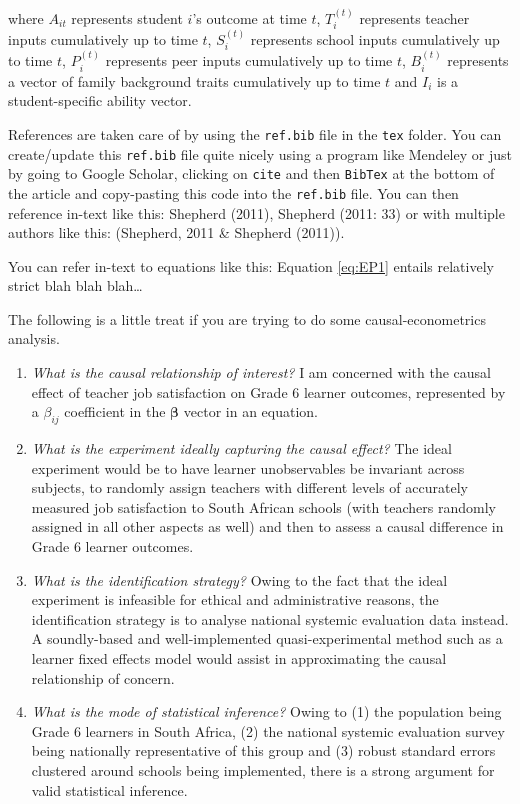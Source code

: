 \documentclass[12pt,preprint, authoryear]{article}
\numberwithin{equation}{section}
\numberwithin{figure}{section}
\numberwithin{table}{section}
\begin{document}
where \(A_{it}\) represents student \(i\)'s outcome at time \(t\),
\(T_i^{(t)}\) represents teacher inputs cumulatively up to time \(t\),
\(S_i^{(t)}\) represents school inputs cumulatively up to time \(t\),
\(P_i^{(t)}\) represents peer inputs cumulatively up to time \(t\),
\(B_i^{(t)}\) represents a vector of family background traits
cumulatively up to time \(t\) and \(I_i\) is a student-specific ability
vector.

References are taken care of by using the \texttt{ref.bib} file in the
\texttt{tex} folder. You can create/update this \texttt{ref.bib} file
quite nicely using a program like Mendeley or just by going to Google
Scholar, clicking on \texttt{cite} and then \texttt{BibTex} at the
bottom of the article and copy-pasting this code into the
\texttt{ref.bib} file. You can then reference in-text like this:
Shepherd (2011), Shepherd (2011: 33) or with multiple authors like this:
(Shepherd, 2011 \& Shepherd (2011)).

You can refer in-text to equations like this: Equation \ref{eq:EP1}
entails relatively strict blah blah blah\ldots{}

The following is a little treat if you are trying to do some
causal-econometrics analysis.

\begin{enumerate}
\def\labelenumi{\arabic{enumi}.}
\item
  \emph{What is the causal relationship of interest?} I am concerned
  with the causal effect of teacher job satisfaction on Grade 6 learner
  outcomes, represented by a \(\beta_{ij}\) coefficient in the
  \(\boldsymbol\beta\) vector in an equation.
\item
  \emph{What is the experiment ideally capturing the causal effect?} The
  ideal experiment would be to have learner unobservables be invariant
  across subjects, to randomly assign teachers with different levels of
  accurately measured job satisfaction to South African schools (with
  teachers randomly assigned in all other aspects as well) and then to
  assess a causal difference in Grade 6 learner outcomes.
\item
  \emph{What is the identification strategy?} Owing to the fact that the
  ideal experiment is infeasible for ethical and administrative reasons,
  the identification strategy is to analyse national systemic evaluation
  data instead. A soundly-based and well-implemented quasi-experimental
  method such as a learner fixed effects model would assist in
  approximating the causal relationship of concern.
\item
  \emph{What is the mode of statistical inference?} Owing to (1) the
  population being Grade 6 learners in South Africa, (2) the national
  systemic evaluation survey being nationally representative of this
  group and (3) robust standard errors clustered around schools being
  implemented, there is a strong argument for valid statistical
  inference.
\end{enumerate}
\end{document}
